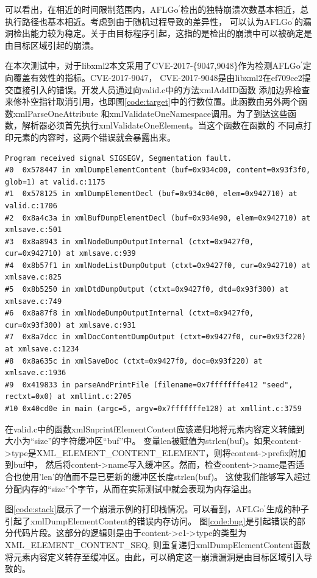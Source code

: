 \documentclass[bachelor]{njupthesis}
\begin{document}
可以看出，在相近的时间限制范围内，AFLGo$^\prime$检出的独特崩溃次数基本相近，总执行路径也基本相近。考虑到由于随机过程导致的差异性，
可以认为AFLGo$^\prime$的漏洞检出能力较为稳定。关于由目标程序引起，这指的是检出的崩溃中可以被确定是由目标区域引起的崩溃。

在本次测试中，对于libxml2本文采用了CVE-2017-\{9047,9048\}作为检测AFLGo$^\prime$定向覆盖有效性的指标。CVE-2017-9047\cite{47CVE}，
CVE-2017-9048\cite{48CVE}是由libxml2在ef709ce2提交直接引入的错误。开发人员通过向valid.c中的方法xmlAddID函数
添加边界检查来修补空指针取消引用，也即图\ref{code:target}中的行数位置。此函数由另外两个函数xmlParseOneAttribute
和xmlValidateOneNamespace调用。为了到达这些函数，解析器必须首先执行xmlValidateOneElement。当这个函数在函数的
不同点打印元素的内容时，这两个错误就会暴露出来。

\renewcommand{\thelstlisting}{5.\arabic{lstlisting}}
\begin{lstlisting}[caption={示例错误打印栈},label={code:stack},basicstyle=\linespread{1.75}\fontsize{6.8}{5}\ttfamily]
Program received signal SIGSEGV, Segmentation fault.
#0  0x578447 in xmlDumpElementContent (buf=0x934c00, content=0x93f3f0, glob=1) at valid.c:1175
#1  0x578125 in xmlDumpElementDecl (buf=0x934c00, elem=0x942710) at valid.c:1706
#2  0x8a4c3a in xmlBufDumpElementDecl (buf=0x934e90, elem=0x942710) at xmlsave.c:501
#3  0x8a8943 in xmlNodeDumpOutputInternal (ctxt=0x9427f0, cur=0x942710) at xmlsave.c:939
#4  0x8b57f1 in xmlNodeListDumpOutput (ctxt=0x9427f0, cur=0x942710) at xmlsave.c:825
#5  0x8b5250 in xmlDtdDumpOutput (ctxt=0x9427f0, dtd=0x93f300) at xmlsave.c:749
#6  0x8a87f8 in xmlNodeDumpOutputInternal (ctxt=0x9427f0, cur=0x93f300) at xmlsave.c:931
#7  0x8a7dcc in xmlDocContentDumpOutput (ctxt=0x9427f0, cur=0x93f220) at xmlsave.c:1234
#8  0x8a635c in xmlSaveDoc (ctxt=0x9427f0, doc=0x93f220) at xmlsave.c:1936
#9  0x419833 in parseAndPrintFile (filename=0x7fffffffe412 "seed", rectxt=0x0) at xmllint.c:2705
#10 0x40cd0e in main (argc=5, argv=0x7fffffffe128) at xmllint.c:3759
\end{lstlisting}

在valid.c中的函数xmlSnprintfElementContent应该递归地将元素内容定义转储到大小为“size”的字符缓冲区“buf”中。
变量len被赋值为strlen(buf)。如果content->type是XML\_ELEMENT\_CONTENT\_ELEMENT，则将content->prefix附加到buf中，
然后将content->name写入缓冲区。然而，检查content->name是否适合也使用'len'的值而不是已更新的缓冲区长度strlen(buf)。
这使我们能够写入超过分配内存的“size”个字节，从而在实际测试中就会表现为内存溢出。

图\ref{code:stack}展示了一个崩溃示例的打印栈情况。可以看到，AFLGo$^\prime$生成的种子引起了xmlDumpElementContent的错误内存访问。
图\ref{code:bug}是引起错误的部分代码片段。这部分的逻辑则是由于content->c1->type的类型为XML\_ELEMENT\_CONTENT\_SEQ,
则重复递归xmlDumpElementContent函数将元素内容定义转存至缓冲区。由此，可以确定这一崩溃漏洞是由目标区域引入导致的。
\end{document}
